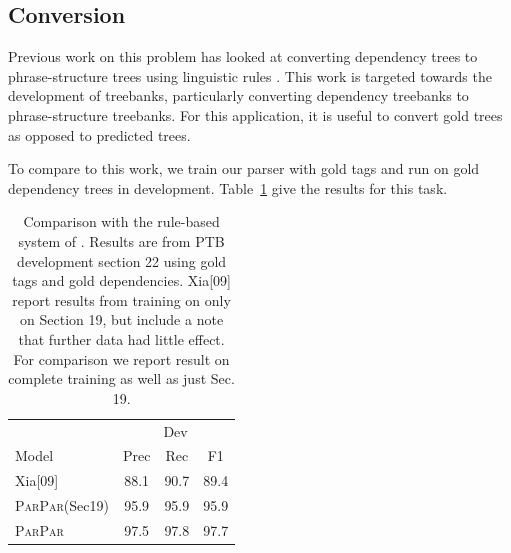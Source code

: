 \documentclass[11pt,letterpaper]{article}
\newcommand{\ParseName}{\textsc{ParPar}}
\begin{document}
\begin{table}
  \centering
  \begin{tabular}{ll}
    
  \end{tabular}
\end{table}

\subsection{Conversion}

Previous work on this problem has looked at converting dependency trees to phrase-structure trees using linguistic rules \cite{xia2001converting,xia2009towards}. This work is targeted towards the development of treebanks, particularly converting dependency treebanks to phrase-structure treebanks.
For this application, it is useful to convert gold trees as opposed to predicted trees.

To compare to this work, we train our parser with gold tags and run on gold dependency trees in development. Table~\ref{tab:convert} give the results for this task.


\begin{table}
  \centering
  \begin{tabular}{|l|ccc|}

    \hline
    & \multicolumn{3}{|c|}{Dev} \\
    Model & Prec & Rec & F1  \\
    \hline

    \hline
    Xia[09]  & 88.1 & 90.7 & 89.4 \\
    \ParseName(Sec19) & 95.9  & 95.9 & 95.9    \\
    \ParseName  & 97.5 &  97.8 & 97.7    \\
    \hline

  \end{tabular}
  \caption{Comparison with the rule-based system of .
    Results are from PTB development section 22 using gold tags and gold
    dependencies.
    Xia[09] report results from training on only on Section 19, but
    include a note that further data had little effect.
    For comparison we report result on complete training as well as just Sec. 19.
  }
  \label{tab:convert}
\end{table}
\end{document}
